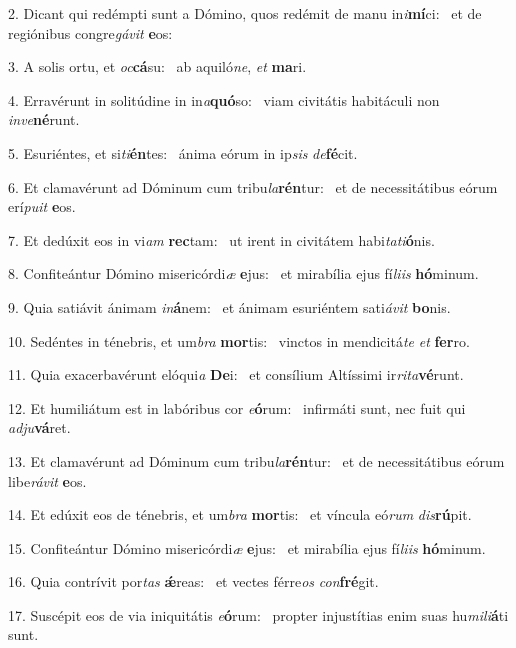 2. Dicant qui redémpti sunt a Dómino, quos redémit de manu in\textit{i}\textbf{mí}ci: \ast\  et de regiónibus congre\textit{gá}\textit{vit} \textbf{e}os:\

3. A solis ortu, et \textit{oc}\textbf{cá}su: \ast\  ab aquiló\textit{ne}, \textit{et} \textbf{ma}ri.\

4. Erravérunt in solitúdine in in\textit{a}\textbf{quó}so: \ast\  viam civitátis habitáculi non \textit{in}\textit{ve}\textbf{né}runt.\

5. Esuriéntes, et si\textit{ti}\textbf{én}tes: \ast\  ánima eórum in ip\textit{sis} \textit{de}\textbf{fé}cit.\

6. Et clamavérunt ad Dóminum cum tribu\textit{la}\textbf{rén}tur: \ast\  et de necessitátibus eórum erí\textit{pu}\textit{it} \textbf{e}os.\

7. Et dedúxit eos in vi\textit{am} \textbf{rec}tam: \ast\  ut irent in civitátem habi\textit{ta}\textit{ti}\textbf{ó}nis.\

8. Confiteántur Dómino misericórdi\textit{æ} \textbf{e}jus: \ast\  et mirabília ejus fí\textit{li}\textit{is} \textbf{hó}minum.\

9. Quia satiávit ánimam \textit{in}\textbf{á}nem: \ast\  et ánimam esuriéntem sati\textit{á}\textit{vit} \textbf{bo}nis.\

10. Sedéntes in ténebris, et um\textit{bra} \textbf{mor}tis: \ast\  vinctos in mendicitá\textit{te} \textit{et} \textbf{fer}ro.\

11. Quia exacerbavérunt elóqui\textit{a} \textbf{De}i: \ast\  et consílium Altíssimi ir\textit{ri}\textit{ta}\textbf{vé}runt.\

12. Et humiliátum est in labóribus cor \textit{e}\textbf{ó}rum: \ast\  infirmáti sunt, nec fuit qui \textit{ad}\textit{ju}\textbf{vá}ret.\

13. Et clamavérunt ad Dóminum cum tribu\textit{la}\textbf{rén}tur: \ast\  et de necessitátibus eórum libe\textit{rá}\textit{vit} \textbf{e}os.\

14. Et edúxit eos de ténebris, et um\textit{bra} \textbf{mor}tis: \ast\  et víncula eó\textit{rum} \textit{dis}\textbf{rú}pit.\

15. Confiteántur Dómino misericórdi\textit{æ} \textbf{e}jus: \ast\  et mirabília ejus fí\textit{li}\textit{is} \textbf{hó}minum.\

16. Quia contrívit por\textit{tas} \textbf{ǽ}reas: \ast\  et vectes férre\textit{os} \textit{con}\textbf{fré}git.\

17. Suscépit eos de via iniquitátis \textit{e}\textbf{ó}rum: \ast\  propter injustítias enim suas hu\textit{mi}\textit{li}\textbf{á}ti sunt.\

